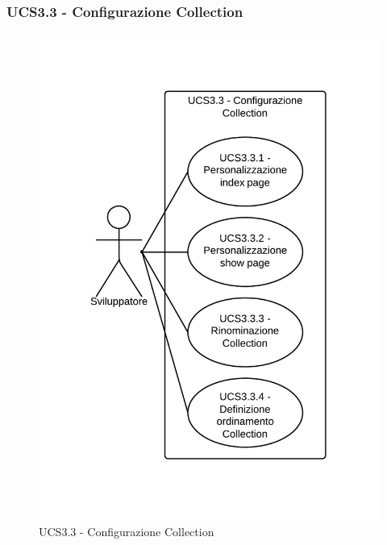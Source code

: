 \subsubsection{UCS3.3 - Configurazione Collection} 
    \begin{figure}[H]
      \includegraphics[width=12cm]{UML/UCS3.3 - Configurazione Collection.png}
      \caption{UCS3.3 - Configurazione Collection} 
    \end{figure}
    
